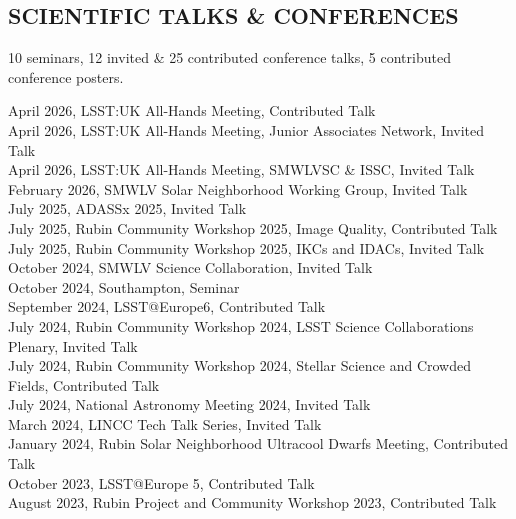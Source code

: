 \documentclass[letter, margin, 10pt]{res} %
\begin{document}
\begin{resume}

\parskip \baselineskip
\vspace{-6pt}
\section{SCIENTIFIC TALKS \& CONFERENCES}
10 seminars, 12 invited \& 25 contributed conference talks, 5 contributed conference posters.

\vspace{-4pt}
April 2026, LSST:UK All-Hands Meeting, Contributed Talk\\
April 2026, LSST:UK All-Hands Meeting, Junior Associates Network, Invited Talk\\
April 2026, LSST:UK All-Hands Meeting, SMWLVSC \& ISSC, Invited Talk\\
February 2026, SMWLV Solar Neighborhood Working Group, Invited Talk\\
July 2025, ADASSx 2025, Invited Talk\\
July 2025, Rubin Community Workshop 2025, Image Quality, Contributed Talk\\
July 2025, Rubin Community Workshop 2025, IKCs and IDACs, Invited Talk\\
October 2024, SMWLV Science Collaboration, Invited Talk\\
October 2024, Southampton, Seminar\\
September 2024, LSST@Europe6, Contributed Talk\\
July 2024, Rubin Community Workshop 2024, LSST Science Collaborations Plenary, Invited Talk\\
July 2024, Rubin Community Workshop 2024, Stellar Science and Crowded Fields, Contributed Talk\\
July 2024, National Astronomy Meeting 2024, Invited Talk\\
March 2024, LINCC Tech Talk Series, Invited Talk\\
January 2024, Rubin Solar Neighborhood Ultracool Dwarfs Meeting, Contributed Talk\\
October 2023, LSST@Europe 5, Contributed Talk\\
August 2023, Rubin Project and Community Workshop 2023, Contributed Talk\\

\end{resume}
\end{document}

